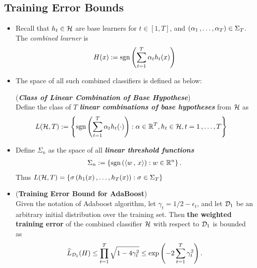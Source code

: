 \documentclass[11pt]{article}
\begin{document}
\subsection{Training Error Bounds}
\begin{itemize}
\item \begin{remark}
Recall that $h_t \in {\mathcal H}$ are base learners for $t \in [1,T]$, and $(\alpha_1 \,{,}\ldots{,}\, \alpha_{T}) \in \Sigma_{T}$. The \emph{combined learner} is
\begin{align*}
H(x) := \text{sgn}\left(\sum_{t=1}^{T}\alpha_t h_t(x)\right)
\end{align*}
\end{remark}

\item The space of all such combined classifiers is defined as below:
\begin{definition}(\textbf{\emph{Class of Linear Combination of Base Hypothese}})\\
Define the class of $T$ \emph{\textbf{linear combinations of base hypotheses}} from ${\mathcal H}$ as
\begin{align}
L({\mathcal H}, T) &:=  \left\{\text{sgn}\left(\sum_{t=1}^{T}\alpha_t h_t(\cdot )\right):  \alpha \in {\mathbb R}^{T},  h_t \in {\mathcal H},  t = 1\,{,}\ldots{,}\, T \right\}  \label{def: linear_ensemble_class}
\end{align}
\end{definition}

\item \begin{definition}
Define $\Sigma_n$  as the space of all \textbf{\emph{linear threshold functions}}
\begin{align*}
\Sigma_n := \left\{\text{sgn}\left(\left\langle w\,,\, x \right\rangle\right):  w \in {\mathbb R}^n\right\}.
\end{align*} Thus $L({\mathcal H}, T) = \left\{\sigma\left(h_1(x) \,{,}\ldots{,}\, h_{T}(x)\right) : \sigma \in \Sigma_{T}\right\}$
\end{definition}



\item \begin{proposition} (\textbf{Training Error Bound for AdaBoost}) \citep{schapire2012boosting}\\
Given the notation of Adaboost algorithm, let $\gamma_t = 1/2 - \epsilon_t$, and let ${\mathcal D}_1$ be an arbitrary initial distribution over the training set. Then \textbf{the weighted training error} of the combined classifier ${\mathcal H}$ with respect to ${\mathcal D}_1$ is bounded as
\begin{align}
\widehat{L}_{{\mathcal D}_1}(H) \le \prod_{t=1}^{T} \sqrt{1 - 4 \gamma_t^2} \le \exp\left(- 2 \sum_{t=1}^{T}\gamma_t^2\right). \label{ineqn: boosting_training_error_bound}
\end{align} 
\end{proposition}
\end{itemize}
\end{document}
